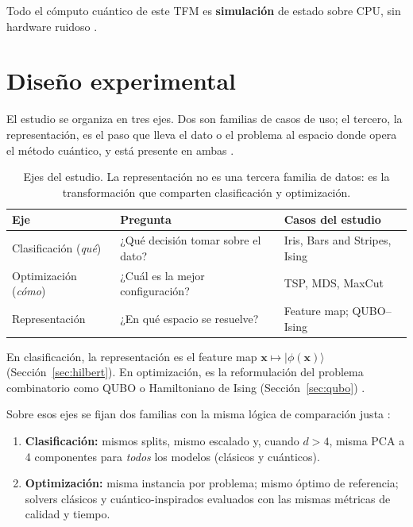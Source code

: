 Todo el cómputo cuántico de este TFM es \textbf{simulación} de estado sobre CPU, sin hardware ruidoso \citep{preskill2018}.
\section{Diseño experimental}

El estudio se organiza en tres ejes. Dos son familias de casos de uso; el tercero, la representación, es el paso que lleva el dato o el problema al espacio donde opera el método cuántico, y está presente en ambas \citep{lloyd2020, pennylaneEmbedBlog, parzygnat2025}.

\begin{table}[!htbp]
\centering
\small
\renewcommand{\arraystretch}{1.2}
\begin{tabular}{@{}lll@{}}
\toprule
\textbf{Eje} & \textbf{Pregunta} & \textbf{Casos del estudio} \\
\midrule
Clasificación (\emph{qué}) & ¿Qué decisión tomar sobre el dato? & Iris, Bars and Stripes, Ising \\
Optimización (\emph{cómo}) & ¿Cuál es la mejor configuración? & TSP, MDS, MaxCut \\
Representación & ¿En qué espacio se resuelve? & Feature map; QUBO--Ising \\
\bottomrule
\end{tabular}
\caption{Ejes del estudio. La representación no es una tercera familia de datos: es la transformación que comparten clasificación y optimización.}
\label{tab:ejes}
\end{table}

En clasificación, la representación es el feature map $\mathbf{x}\mapsto\lvert\phi(\mathbf{x})\rangle$ (Sección~\ref{sec:hilbert}). En optimización, es la reformulación del problema combinatorio como QUBO o Hamiltoniano de Ising (Sección~\ref{sec:qubo}) \citep{lucas2014}.

Sobre esos ejes se fijan dos familias con la misma lógica de comparación justa \citep{bowles2024, qmlBenchmarks}:

\begin{enumerate}
    \item \textbf{Clasificación:} mismos splits, mismo escalado y, cuando $d>4$, misma PCA a 4 componentes para \emph{todos} los modelos (clásicos y cuánticos).
    \item \textbf{Optimización:} misma instancia por problema; mismo óptimo de referencia; solvers clásicos y cuántico-inspirados evaluados con las mismas métricas de calidad y tiempo.
\end{enumerate}

